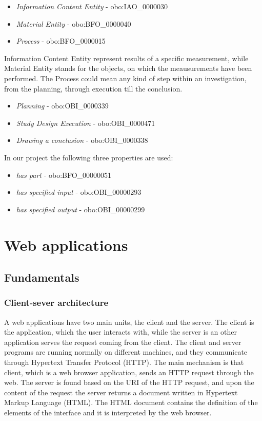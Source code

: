 \begin{itemize}
	\item  \textit{Information Content Entity} - obo:IAO\_0000030
	\item  \textit{Material Entity} - obo:BFO\_0000040
	\item  \textit{Process} - obo:BFO\_0000015
\end{itemize}

Information Content Entity represent results of a specific measurement, while Material Entity stands for the objects, on which the meausurements have been performed. 
The Process could mean any kind of step within an investigation, from the planning, through execution till the conclusion.

\begin{itemize}
	\item  \textit{Planning} - obo:OBI\_0000339
	\item  \textit{Study Design Execution} - obo:OBI\_0000471
	\item  \textit{Drawing a conclusion} - obo:OBI\_0000338
\end{itemize}


In our project the following three properties are used:

\begin{itemize}
	\item  \textit{has part} - obo:BFO\_00000051
	\item  \textit{has specified input} - obo:OBI\_00000293
	\item  \textit{has specified output} - obo:OBI\_00000299
\end{itemize}


\section{Web applications}

\subsection{Fundamentals} \label{fundamentals}

\subsubsection{Client-sever architecture} \label{clientServer}

A web applications have two main units, the client and the server. The client is the application, which the user interacts with, while the server is an other application serves the request coming from the client. The client and server programs are running normally on different machines, and they communicate through Hypertext Transfer Protocol (HTTP). The main mechanism is that client, which is a web browser application, sends an HTTP request through the web. The server is found based on the URI of the HTTP request, and upon the content of the request the server returns a document written in Hypertext Markup Language (HTML). The HTML document contains the definition of the elements of the interface and it is interpreted by the web browser.

